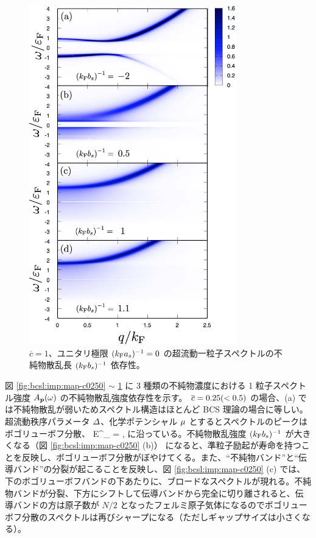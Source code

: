 \begin{figure}[t]
\centering
\includegraphics[width=90mm]{eps/bcsl-spec-c1000.eps}
\caption{$\overline{c}=1$、ユニタリ極限 $(k_{\text{F}} a_s)^{-1}=0$ の超流動一粒子スペクトルの不純物散乱長 $(k_{\text{F}} b_s)^{-1}$ 依存性。}
\label{fig:bcsl:imp:map-c1000}
\end{figure}


図 \ref{fig:bcsl:imp:map-c0250} $\sim$ \ref{fig:bcsl:imp:map-c1000} に 3 種類の不純物濃度における 1 粒子スペクトル強度 $A_{\bm{p}}(\omega)$ の不純物散乱強度依存性を示す。 $\overline{c}=0.25 (<0.5)$ の場合、(a) では不純物散乱が弱いためスペクトル構造はほとんど BCS 理論の場合に等しい。超流動秩序パラメータ $\varDelta$、化学ポテンシャル $\mu$ とするとスペクトルのピークはボゴリューボフ分散、
\beq
E^{\pm}_{\bp} = \pm {},
\eeq
に沿っている。不純物散乱強度 $(k_{\text{F}} b_s)^{-1}$ が大きくなる（図 \ref{fig:bcsl:imp:map-c0250} (b)） になると、準粒子励起が寿命を持つことを反映し、ボゴリューボフ分散がぼやけてくる。また、“不純物バンド”と“伝導バンド”の分裂が起こることを反映し、図 \ref{fig:bcsl:imp:map-c0250} (c) では、下のボゴリューボフバンドの下あたりに、ブロードなスペクトルが現れる。不純物バンドが分裂、下方にシフトして伝導バンドから完全に切り離されると、伝導バンドの方は原子数が $N/2$ となったフェルミ原子気体になるのでボゴリューボフ分散のスペクトルは再びシャープになる（ただしギャップサイズは小さくなる）。

